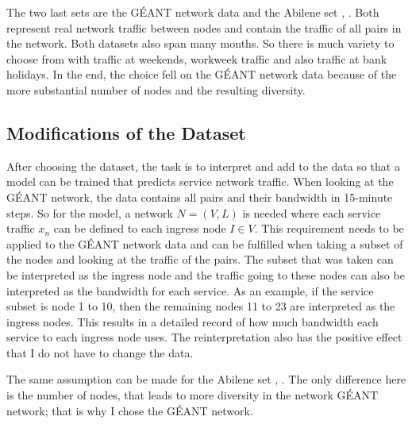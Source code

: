 The two last sets are the GÉANT network data and the Abilene set \cite{SNDlib10}, \cite{OrlowskiPioroTomaszewskiWessaely2010}.
Both represent real network traffic between nodes and contain the traffic of all pairs in the network.
Both datasets also span many months.
So there is much variety to choose from with traffic at weekends, workweek traffic and also traffic at bank holidays.
In the end, the choice fell on the GÉANT network data because of the more substantial number of nodes and the resulting diversity.

\subsection{Modifications of the Dataset}\label{datasetMod}
After choosing the dataset, the task is to interpret and add to the data so that a model can be trained that predicts service network traffic.
When looking at the GÉANT network, the data contains all pairs and their bandwidth in 15-minute steps.
So for the model, a network $N = (V,L)$ is needed where each service traffic $x_{n}$ can be defined to each ingress node $I\in V$.
This requirement needs to be applied to the GÉANT network data and can be fulfilled when taking a subset of the nodes and looking at the traffic of the pairs.
The subset that was taken can be interpreted as the ingress node and the traffic going to these nodes can also be interpreted as the bandwidth for each service.
As an example, if the service subset is node 1 to 10, then the remaining nodes 11 to 23 are interpreted as the ingress nodes.
This results in a detailed record of how much bandwidth each service to each ingress node uses.
The reinterpretation also has the positive effect that I do not have to change the data.

The same assumption can be made for the Abilene set \cite{SNDlib10}, \cite{OrlowskiPioroTomaszewskiWessaely2010}.
The only difference here is the number of nodes, that leads to more diversity in the network GÉANT network; that is why I chose the GÉANT network.